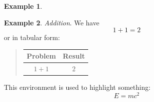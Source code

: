 \documentclass[%
oneside,                 %
final,                   %
10pt]{article}
\theoremstyle{definition}
\newtheorem{example}{Example}[section]
\begin{document}
\begin{enumerate}
\begin{example}
\end{example}
\begin{example}
\label{ex:math:1p1}
\noindent\emph{Addition}.
We have
\[ 1 + 1 = 2 \]
or in tabular form:
\begin{quote}
\begin{tabular}{cc}
\hline
\multicolumn{1}{c}{ Problem } & \multicolumn{1}{c}{ Result } \\
\hline
$1+1$   & $2$    \\
\hline
\end{tabular}
\end{quote}
\noindent
\end{example}
\begin{tcolorbox}[%
boxrule=1mm,
coltitle=black,
colframe=blue!45!white,
colback=blue!15!white,
width=(.9\linewidth),before=\hfill,after=\hfill,
adjusted title={Highlight box!}]
This environment is used to highlight something:
\[ E = mc^2 \]
\end{tcolorbox}

\end{enumerate}
\end{document}
